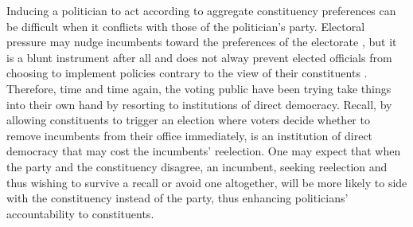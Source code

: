 \documentclass{article}
\begin{document}
		Inducing a politician to act according to aggregate constituency preferences
		can be difficult when
		it conflicts with those of the politician's party.
		Electoral pressure may nudge incumbents toward the preferences of the electorate
		\autocite{millerConstituencyInfluenceCongress1963},
		but it is a blunt instrument after all
		and does not alway prevent
		elected officials from choosing to implement policies contrary to the view of their constituents
		\autocite{kirklandIndecisionAmericanLegislatures2018}.
		Therefore, time and time again, the voting public have been trying take things into their own hand
		by resorting to institutions of direct democracy.
		Recall,
		by allowing constituents to trigger an election where voters decide whether to remove incumbents from their office immediately, 
		is an institution
		of direct democracy
		that may cost the incumbents' reelection.
		One may
		expect that 
		when the party and the constituency disagree,
		an incumbent,
		seeking reelection and thus 
		wishing to survive a recall or 
		avoid one altogether,
		will be more likely to side with the constituency instead of the party,
		thus enhancing politicians' accountability to constituents.
		
\end{document}
